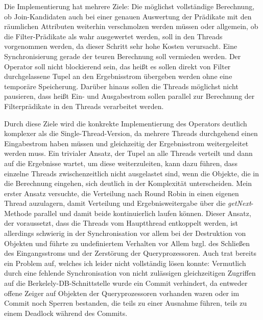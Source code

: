 \documentclass[a4paper,12pt,twoside]{article}
\newcommand{\Fb}[1]{\textit{#1}} %
\begin{document}
Die Implementierung hat mehrere Ziele: Die möglichst vollständige Berechnung, ob Join-Kandidaten auch bei einer genauen Auswertung der Prädikate mit den räumlichen Attributen weiterhin verschmolzen werden müssen oder allgemein, ob die Filter-Prädikate als wahr ausgewertet werden, soll in den Threads vorgenommen werden, da dieser Schritt sehr hohe Kosten verursacht. Eine Synchronisierung gerade der teuren Berechnung soll vermieden werden. Der Operator soll nicht blockierend sein, das heißt es sollen direkt von Filter durchgelassene Tupel an den Ergebnisstrom übergeben werden ohne eine temporäre Speicherung. Darüber hinaus sollen die Threads möglichst nicht pausieren, dass heißt Ein- und Ausgabestrom sollen parallel zur Berechnung der Filterprädikate in den Threads verarbeitet werden.

Durch diese Ziele wird die konkrekte Implementierung des Operators deutlich komplexer als die Single-Thread-Version, da mehrere Threads durchgehend einen Eingabestrom haben müssen und gleichzeitig der Ergebnisstrom weitergeleitet werden muss. Ein trivialer Ansatz, der Tupel an alle Threads verteilt und dann auf die Ergebnisse wartet, um diese weiterzuleiten, kann dazu führen, dass einzelne Threads zwischenzeitlich nicht ausgelastet sind, wenn die Objekte, die in die Berechnung eingehen, sich deutlich in der Komplexität unterscheiden. Mein erster Ansatz versuchte, die Verteilung nach Round Robin in einen eigenen Thread auzulagern, damit Verteilung und Ergebnisweitergabe über die \Fb{getNext}-Methode parallel und damit beide kontinuierlich laufen können. Dieser Ansatz, der voraussetzt, dass die Threads vom Hauptthread entkoppelt werden, ist allerdings schwierig in der Synchronisation vor allem bei der Destruktion von Objekten und führte zu undefiniertem Verhalten vor Allem bzgl. des Schließen des Eingangsstroms und der Zerstörung der Queryprozessoren. Auch trat bereits ein Problem auf, welches ich leider nicht vollständig lösen konnte: Vermutlich durch eine fehlende Synchronisation von nicht zulässigen gleichzeitigen Zugriffen auf die Berkelely-DB-Schnittstelle wurde ein Commit verhindert, da entweder offene Zeiger auf Objekten der Queryprozessoren vorhanden waren oder im Commit noch Sperren bestanden, die teils zu einer Ausnahme führen, teils zu einem Deadlock während des Commits.
\end{document}
